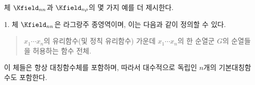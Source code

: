 
체 $\Kfield_{nn}$과 $\Kfield_{n\rho}$의 몇 가지 예를 더 제시한다.

1. 체 $\Kfield_{nn}$은 라그랑주 종영역이며, 이는 다음과 같이 정의할 수 있다.
\begin{quote}
\glqq{}$x_1\cdots x_n$의 유리함수(및 정칙 유리함수) 가운데 $x_1\cdots x_n$의 한 순열군 $G$의 순열들을 허용하는 함수 전체.
\grqq{}
\end{quote}
이 체들은 항상 대칭함수체를 포함하며, 따라서 대수적으로 독립인 $n$개의 기본대칭함수도 포함한다.
